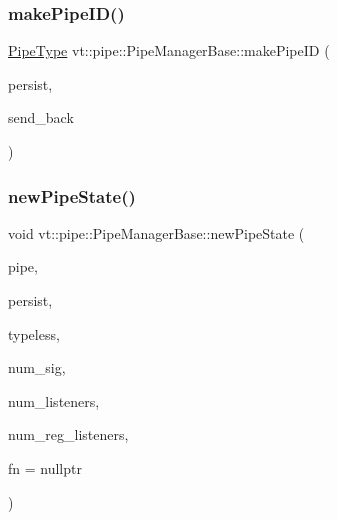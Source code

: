 \mbox{\label{structvt_1_1pipe_1_1_pipe_manager_base_af1ba11407837cb69b4d205dd7ba880b0}} 
\subsubsection{\texorpdfstring{make\+Pipe\+I\+D()}{makePipeID()}}
{\footnotesize\ttfamily \hyperlink{namespacevt_ac9852acda74d1896f48f406cd72c7bd3}{Pipe\+Type} vt\+::pipe\+::\+Pipe\+Manager\+Base\+::make\+Pipe\+ID (\begin{DoxyParamCaption}\item[{bool const}]{persist,  }\item[{bool const}]{send\+\_\+back }\end{DoxyParamCaption})\hspace{0.3cm}{\ttfamily [protected]}}

\mbox{\label{structvt_1_1pipe_1_1_pipe_manager_base_a458f8135ed2a44ec51afb21676c5db50}} 
\subsubsection{\texorpdfstring{new\+Pipe\+State()}{newPipeState()}}
{\footnotesize\ttfamily void vt\+::pipe\+::\+Pipe\+Manager\+Base\+::new\+Pipe\+State (\begin{DoxyParamCaption}\item[{\hyperlink{namespacevt_ac9852acda74d1896f48f406cd72c7bd3}{Pipe\+Type} const \&}]{pipe,  }\item[{bool}]{persist,  }\item[{bool}]{typeless,  }\item[{\hyperlink{namespacevt_a9b39ce9494bb04674d0d5b895a5aa50f}{Ref\+Type}}]{num\+\_\+sig,  }\item[{\hyperlink{namespacevt_a9b39ce9494bb04674d0d5b895a5aa50f}{Ref\+Type}}]{num\+\_\+listeners,  }\item[{\hyperlink{namespacevt_a9b39ce9494bb04674d0d5b895a5aa50f}{Ref\+Type}}]{num\+\_\+reg\+\_\+listeners,  }\item[{\hyperlink{structvt_1_1pipe_1_1_pipe_manager_base_a983e301505317c5ba2041461e7dec84a}{Dispatch\+Func\+Type}}]{fn = {\ttfamily nullptr} }\end{DoxyParamCaption})\hspace{0.3cm}{\ttfamily [protected]}}

